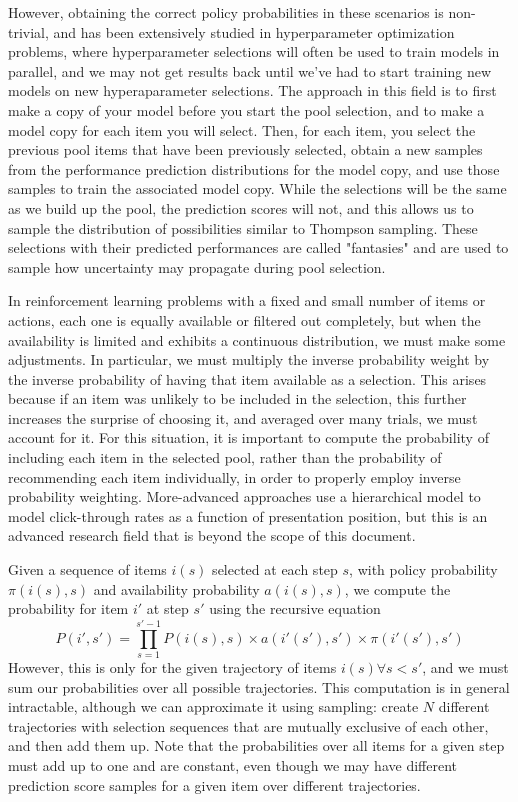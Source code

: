 \documentclass[manuscript, nonacm, screen=true]{acmart}
\begin{document}
However, obtaining the correct policy probabilities in these scenarios is non-trivial, and has been extensively studied in hyperparameter optimization problems\cite{parallel_hyperparameter_tuning,parallel_hyperparameter_tuning2}, where hyperparameter selections will often be used to train models in parallel, and we may not get results back until we've had to start training new models on new hyperaparameter selections. The approach in this field is to first make a copy of your model before you start the pool selection, and to make a model copy for each item you will select. Then, for each item, you select the previous pool items that have been previously selected, obtain a new samples from the performance prediction distributions for the model copy, and use those samples to train the associated model copy. While the selections will be the same as we build up the pool, the prediction scores will not, and this allows us to sample the distribution of possibilities similar to Thompson sampling. These selections with their predicted performances are called "fantasies" and are used to sample how uncertainty may propagate during pool selection.

In reinforcement learning problems with a fixed and small number of items or actions, each one is equally available or filtered out completely, but when the availability is limited and exhibits a continuous distribution, we must make some adjustments. In particular, we must multiply the inverse probability weight by the inverse probability of having that item available as a selection. This arises because if an item was unlikely to be included in the selection, this further increases the surprise of choosing it, and averaged over many trials, we must account for it. For this situation, it is important to compute the probability of including each item in the selected pool, rather than the probability of recommending each item individually, in order to properly employ inverse probability weighting.  More-advanced approaches use a hierarchical model to model click-through rates as a function of presentation position\cite{zappella_position_based}, but this is an advanced research field that is beyond the scope of this document.

Given a sequence of items $i(s)$ selected at each step $s$, with policy probability $\pi(i(s), s)$ and availability probability $a(i(s), s)$, we compute the probability for item $i'$ at step $s'$ using the recursive equation \begin{equation}
P(i',s')=\prod_{s=1}^{s'-1} P(i(s),s)\times a(i'(s'),s')\times \pi(i'(s'),s')
\end{equation}However, this is only for the given trajectory of items $i(s)\forall s<s'$, and we must sum our probabilities over all possible trajectories. This computation is in general intractable, although we can approximate it using sampling: create $N$ different trajectories with selection sequences that are mutually exclusive of each other, and then add them up. Note that the probabilities over all items for a given step must add up to one and are constant, even though we may have different prediction score samples for a given item over different trajectories. 
\end{document}
